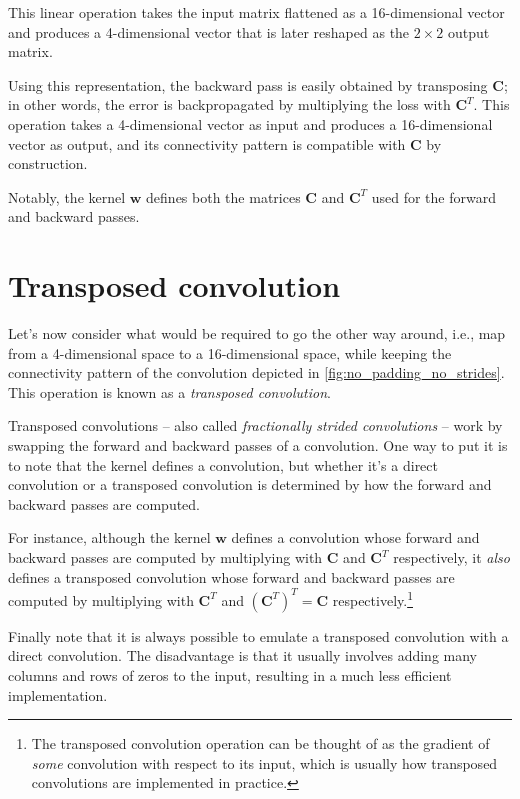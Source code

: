 This linear operation takes the input matrix flattened as a 16-dimensional
vector and produces a 4-dimensional vector that is later reshaped as the $2
\times 2$ output matrix.

Using this representation, the backward pass is easily obtained by transposing
$\mathbf{C}$; in other words, the error is backpropagated by multiplying the
loss with $\mathbf{C}^T$. This operation takes a 4-dimensional vector as input
and produces a 16-dimensional vector as output, and its connectivity pattern is
compatible with $\mathbf{C}$ by construction.

Notably, the kernel $\mathbf{w}$ defines both the matrices $\mathbf{C}$ and
$\mathbf{C}^T$ used for the forward and backward passes.

\section{Transposed convolution}

Let's now consider what would be required to go the other way around, i.e., map
from a 4-dimensional space to a 16-dimensional space, while keeping the
connectivity pattern of the convolution depicted in
\autoref{fig:no_padding_no_strides}. This operation is known as a {\em
transposed convolution}.

Transposed convolutions -- also called {\em fractionally strided convolutions\/}
-- work by swapping the forward and backward passes of a convolution. One way to
put it is to note that the kernel defines a convolution, but whether it's a
direct convolution or a transposed convolution is determined by how the forward
and backward passes are computed.

For instance, although the kernel $\mathbf{w}$ defines a convolution whose
forward and backward passes are computed by multiplying with $\mathbf{C}$ and
$\mathbf{C}^T$ respectively, it {\em also\/} defines a transposed convolution
whose forward and backward passes are computed by multiplying with
$\mathbf{C}^T$ and $(\mathbf{C}^T)^T = \mathbf{C}$ respectively.\footnote{The
    transposed convolution operation can be thought of as the gradient of {\em
    some\/} convolution with respect to its input, which is usually how
    transposed convolutions are implemented in practice.}

Finally note that it is always possible to emulate a transposed convolution with
a direct convolution. The disadvantage is that it usually involves adding many
columns and rows of zeros to the input, resulting in a much less efficient
implementation.

